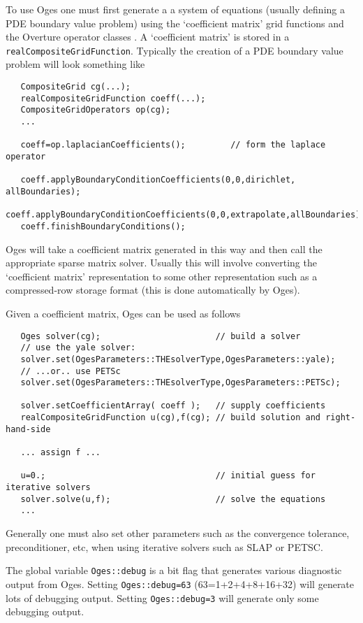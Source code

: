 \documentclass[11pt]{article}
\begin{document}
To use Oges one must first generate a a system of equations (usually
defining a PDE boundary value problem) using the `coefficient matrix'
grid functions and the Overture operator classes \cite{GF}\cite{OPERATORS}\cite{brown:1996}. 
A `coefficient matrix'
is stored in a {\tt realCompositeGridFunction}. Typically the creation of
a PDE boundary value problem will look something like
{\footnotesize
\begin{verbatim}
   CompositeGrid cg(...);
   realCompositeGridFunction coeff(...);
   CompositeGridOperators op(cg); 
   ...

   coeff=op.laplacianCoefficients();         // form the laplace operator 

   coeff.applyBoundaryConditionCoefficients(0,0,dirichlet,  allBoundaries);
   coeff.applyBoundaryConditionCoefficients(0,0,extrapolate,allBoundaries);
   coeff.finishBoundaryConditions();
\end{verbatim}
}
Oges will take a
coefficient matrix generated in this way and then call the appropriate
sparse matrix solver. Usually this will involve converting the `coefficient matrix'
representation to some other representation such as a compressed-row storage format (this is
done automatically by Oges).

Given a coefficient matrix, Oges can be used as follows
{\footnotesize
\begin{verbatim}
   Oges solver(cg);                       // build a solver
   // use the yale solver:
   solver.set(OgesParameters::THEsolverType,OgesParameters::yale);   
   // ...or.. use PETSc
   solver.set(OgesParameters::THEsolverType,OgesParameters::PETSc);   

   solver.setCoefficientArray( coeff );   // supply coefficients
   realCompositeGridFunction u(cg),f(cg); // build solution and right-hand-side

   ... assign f ...

   u=0.;                                  // initial guess for iterative solvers
   solver.solve(u,f);                     // solve the equations
   ...
\end{verbatim}
}
Generally one must also set other parameters such as the convergence tolerance, preconditioner, etc, when using
iterative solvers such as SLAP or PETSC.

The global variable {\tt Oges::debug} is a bit flag that generates various diagnostic output
from Oges. Setting {\tt Oges::debug=63} (63=1+2+4+8+16+32) will generate lots of debugging output. Setting
{\tt Oges::debug=3} will generate only some debugging output. 
\end{document}
